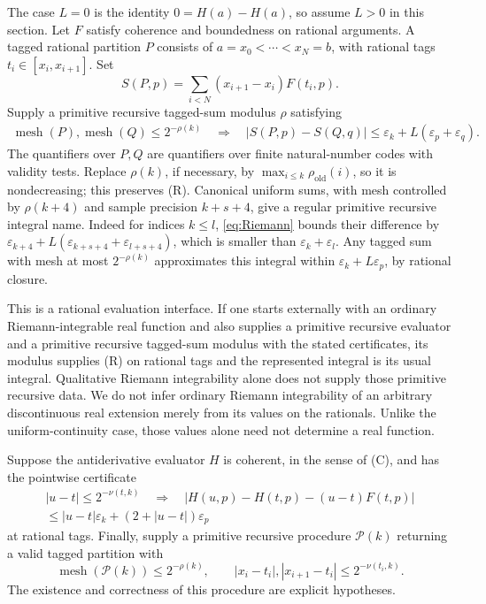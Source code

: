 \documentclass[11pt]{article}
\theoremstyle{definition}
\newcommand{\eps}{\varepsilon}
\newcommand{\abs}[1]{\left|#1\right|}
\newcommand{\mesh}{\operatorname{mesh}}
\begin{document}
The case \(L=0\) is the identity \(0=H(a)-H(a)\), so assume \(L>0\)
in this section.  Let \(F\) satisfy coherence and boundedness on
rational arguments.  A
tagged rational partition \(P\) consists of
\(a=x_0<\cdots<x_N=b\), with rational tags
\(t_i\in[x_i,x_{i+1}]\).  Set
\[
 S(P,p)=\sum_{i<N}(x_{i+1}-x_i)F(t_i,p).
\]
Supply a primitive recursive tagged-sum modulus \(\rho\) satisfying
\begin{equation}
 \begin{split}
 \mesh(P),\mesh(Q)\le2^{-\rho(k)}\quad\Longrightarrow\quad
 \abs{S(P,p)-S(Q,q)}\le\eps_k+L(\eps_p+\eps_q).
 \end{split}\tag{R}\label{eq:Riemann}
\end{equation}
The quantifiers over \(P,Q\) are quantifiers over finite natural-number
codes with validity tests.  Replace \(\rho(k)\), if necessary, by
\(\max_{i\le k}\rho_{\mathrm{old}}(i)\), so it is nondecreasing;
this preserves (R).  Canonical uniform sums, with mesh controlled
by \(\rho(k+4)\) and sample precision \(k+s+4\), give a regular
primitive recursive integral name.  Indeed for indices \(k\le l\),
\eqref{eq:Riemann} bounds their difference by
\(\eps_{k+4}+L(\eps_{k+s+4}+\eps_{l+s+4})\), which is smaller than
\(\eps_k+\eps_l\).  Any tagged sum with mesh at most
\(2^{-\rho(k)}\) approximates this integral within
\(\eps_k+L\eps_p\), by rational closure.

This is a rational evaluation interface.  If one starts externally with
an ordinary Riemann-integrable real function and also supplies a
primitive recursive evaluator and a primitive recursive tagged-sum
modulus with the stated certificates, its modulus supplies (R) on
rational tags and the represented integral is its usual integral.
Qualitative Riemann integrability alone does not supply those primitive
recursive data.  We do not infer ordinary Riemann integrability of
an arbitrary discontinuous real extension merely from its values on
the rationals.  Unlike the uniform-continuity case, those values alone
need not determine a real function.

Suppose the antiderivative evaluator \(H\) is coherent, in the sense of
(C), and has the pointwise certificate
\begin{equation}
 \begin{split}
 \abs{u-t}\le2^{-\nu(t,k)}\quad\Longrightarrow\quad
 \abs{H(u,p)-H(t,p)-(u-t)F(t,p)}\\
 \le\abs{u-t}\eps_k+(2+\abs{u-t})\eps_p
 \end{split}\tag{PD}\label{eq:PD}
\end{equation}
at rational tags.  Finally, supply a primitive recursive procedure
\(\mathcal P(k)\) returning a valid tagged partition with
\begin{equation}
 \mesh(\mathcal P(k))\le2^{-\rho(k)},\qquad
 \abs{x_i-t_i},\abs{x_{i+1}-t_i}\le2^{-\nu(t_i,k)}.
 \tag{P}\label{eq:partitionwitness}
\end{equation}
The existence and correctness of this procedure are explicit hypotheses.
\end{document}
